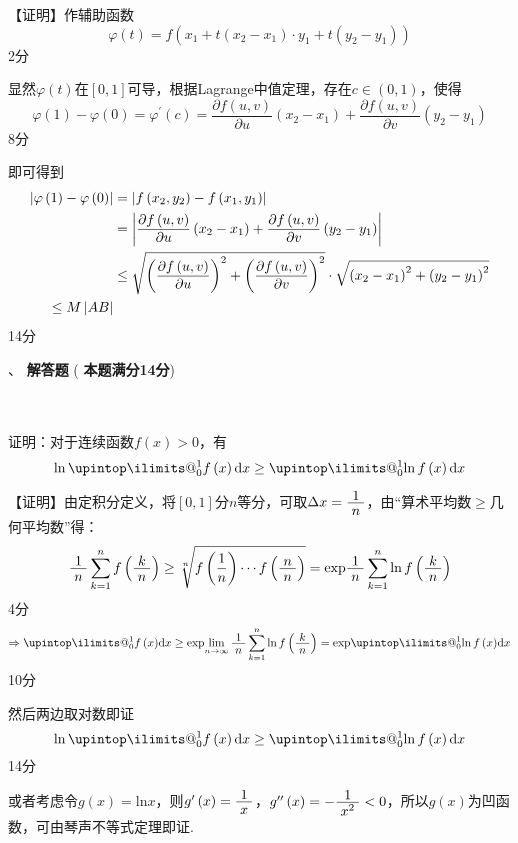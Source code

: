 \documentclass[11pt,twoside]{ctexart}
\makeatletter
\newlength{\wot}
\newcounter{ns}
\newcounter{ts}
\newcommand{\wns}{\stepcounter{ns}\CJKnumber{\thens}、}
\newcommand{\tbs}{\begin{tabular}{|c|c|c|}\hline \makebox[\wot]{得分}&\makebox[\wot]{评卷人}&\makebox[\wot]{复核人}\\ \hline
		& &\\ \hline\end{tabular}}
\newcommand{\ws}[2]{\raisebox{-1ex}{\begin{minipage}[b]{4.6\wot}\tbs\end{minipage}}
	\begin{minipage}[t]{\textwidth-6\wot} {\heiti \wns #1 } #2 \end{minipage} }
\newcommand{\upint}{\DOTSI\upintop\ilimits@}
\newcommand{\zfrac}[2]{\dfrac{{\raisebox{-0.7mm}{$#1$}}}{\;{\raisebox{0.2mm}{$#2$}}\;}}
\makeatother
\begin{document}
【证明】作辅助函数
\[\varphi ( t ) = f \left( x _ { 1 } + t \left( x _ { 2 } - x _ { 1 } \right) \cdot y _ { 1 } + t \left( y _ { 2 } - y _ { 1 } \right) \right)\]
\hfill\dotfill 2分

显然$\varphi(t)$在$[0,1]$可导，根据Lagrange中值定理，存在$c\in(0,1)$，使得
\[\varphi ( 1 ) - \varphi ( 0 ) = \varphi ^ { \prime } ( c ) = \frac { \partial f ( u , v ) } { \partial u } \left( x _ { 2 } - x _ { 1 } \right) + \frac { \partial f ( u , v ) } { \partial v } \left( y _ { 2 } - y _ { 1 } \right)\]
\hfill\dotfill 8分

即可得到
\begin{align*}
\left|\varphi\left(1\right)-\varphi\left(0\right)\right|&=\left| f\left(x_2,y_2\right)-f\left(x_1,y_1\right)\right|\\
&=\left|\zfrac{\partial f\left(u,v\right)}{\partial u}\left(x_2-x_1\right)+\zfrac{\partial f\left(u,v\right)}{\partial v}\left(y_2-y_1\right)\right|\\
&\leq\sqrt{\left(\zfrac{\partial f\left(u,v\right)}{\partial u}\right)^2+\left(\zfrac{\partial f\left(u,v\right)}{\partial v}\right)^2}\cdot\sqrt{\left(x_2-x_1\right)^2+\left(y_2-y_1\right)^2}\\
\leq M\left| AB\right|
\end{align*}
\hfill\dotfill 14分




\ws { \textbf{解答题}}{( \textbf{本题满分14分})\\}\\\\
证明：对于连续函数$f(x)>0$，有
\[
\ln\upint_0^1{f\left(x\right)\mathrm{d}x\geq\upint_0^1{\ln f\left(x\right)\mathrm{d}x}}
\]

【证明】由定积分定义，将$[0,1]$分$n$等分，可取$\Delta x=\displaystyle \zfrac{1}{n}$，由“算术平均数$\geq$几何平均数”得：
\[
\zfrac{1}{n}\sum_{k=1}^n{f\left(\zfrac{k}{n}\right)\geq\sqrt[n]{f\left(\frac{1}{n}\right)\cdots f\left(\zfrac{n}{n}\right)}}=\mathrm{exp}{\zfrac{1}{n}\sum_{k=1}^n{\ln f\left(\zfrac{k}{n}\right)}}
\]
\hfill\dotfill 4分
\[
\Rightarrow\upint_0^1{f\left(x\right)}\mathrm{d}x\geq \mathrm{exp}{\lim_{n\rightarrow\infty}\zfrac{1}{n}\sum_{k=1}^n{\ln f\left(\zfrac{k}{n}\right)}}=\mathrm{exp}{\upint_0^1{\ln f\left(x\right)}}\mathrm{d}x
\]
\hfill\dotfill 10分

然后两边取对数即证
\[
\ln\upint_0^1{f\left(x\right)\mathrm{d}x\geq\upint_0^1{\ln f\left(x\right)\mathrm{d}x}}
\]
\hfill\dotfill 14分

或者考虑令$g(x)=\mathrm {ln}x$，则$g'\left(x\right)=\displaystyle \zfrac{1}{x}$，$g''\left(x\right)=-\displaystyle\zfrac{1}{x^2}<0$，所以$g(x)$为凹函数，可由琴声不等式定理即证.\\
\end{document}
